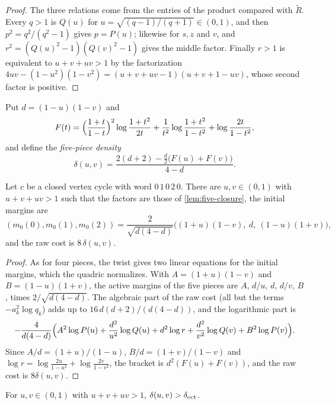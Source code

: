 \begin{proof}
The three relations come from the entries of the product compared with $\widetilde R$. Every
$q>1$ is $Q(u)$ for $u=\sqrt{(q-1)/(q+1)}\in(0,1)$, and then $p^2=q^2/(q^2-1)$ gives $p=P(u)$;
likewise for $s,z$ and $v$, and $r^2=(Q(u)^2-1)(Q(v)^2-1)$ gives the middle factor. Finally $r>1$
is equivalent to $u+v+uv>1$ by the factorization
$4uv-(1-u^2)(1-v^2)=(u+v+uv-1)(u+v+1-uv)$, whose second factor is positive.
\end{proof}

Put $d=(1-u)(1-v)$ and
\[
 F(t)=\Bigl(\frac{1+t}{1-t}\Bigr)^{2}\log\frac{1+t^2}{2t}+\frac{1}{t^2}\log\frac{1+t^2}{1-t^2}
 +\log\frac{2t}{1-t^2},
\]
and define the \emph{five-piece density}
\begin{equation}\label{eq:five-density}
 \delta(u,v)=\frac{2(d+2)-\tfrac{d}{2}\bigl(F(u)+F(v)\bigr)}{4-d}.
\end{equation}

\begin{lemma}\label{lem:five-param}
Let $c$ be a closed vertex cycle with word $0\,1\,0\,2\,0$. There are $u,v\in(0,1)$ with
$u+v+uv>1$ such that the factors are those of \cref{lem:five-closure}, the initial margins are
\[
 (m_0(0),m_0(1),m_0(2))=\frac{2}{\sqrt{d(4-d)}}\bigl((1+u)(1-v),\ d,\ (1-u)(1+v)\bigr),
\]
and the raw cost is $8\,\delta(u,v)$.
\end{lemma}

\begin{proof}
As for four pieces, the twist gives two linear equations for the initial margins, which the
quadric normalizes. With $A=(1+u)(1-v)$ and $B=(1-u)(1+v)$, the active margins of the five pieces
are $A$, $d/u$, $d$, $d/v$, $B$, times $2/\sqrt{d(4-d)}$. The algebraic part of the raw cost (all
but the terms $-a_k^2\log q_k$) adds up to $16\,d(d+2)/(d(4-d))$, and the logarithmic part is
\[
 -\frac{4}{d(4-d)}\Bigl(A^2\log P(u)+\frac{d^2}{u^2}\log Q(u)+d^2\log r+\frac{d^2}{v^2}\log Q(v)
 +B^2\log P(v)\Bigr).
\]
Since $A/d=(1+u)/(1-u)$, $B/d=(1+v)/(1-v)$ and
$\log r=\log\frac{2u}{1-u^2}+\log\frac{2v}{1-v^2}$, the bracket is $d^2(F(u)+F(v))$, and the
raw cost is $8\delta(u,v)$.
\end{proof}

\begin{theorem}\label{thm:five-density}
For $u,v\in(0,1)$ with $u+v+uv>1$, $\delta(u,v)>\delta_{\mathrm{oct}}$.
\end{theorem}

